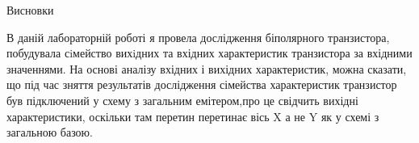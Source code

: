 \documentclass[a4paper,14pt]{extreport}
\begin{document}
\clearpage
\newpage
\begin{center}Висновки\\ \end{center}
В даній лабораторній роботі я провела дослідження біполярного транзистора, побудувала сiмейство вихiдних та вхідних характеристик транзистора за вхідними значеннями. На основі аналізу вхідних і вихідних характеристик, можна сказати, що під час зняття результатів дослідження
сімейства характеристик транзистор був підключений у схему з загальним
емітером,про це свідчить вихідні характеристики, оскільки там перетин перетинає вісь X а не Y як у схемі з загальною базою.
\end{document}
